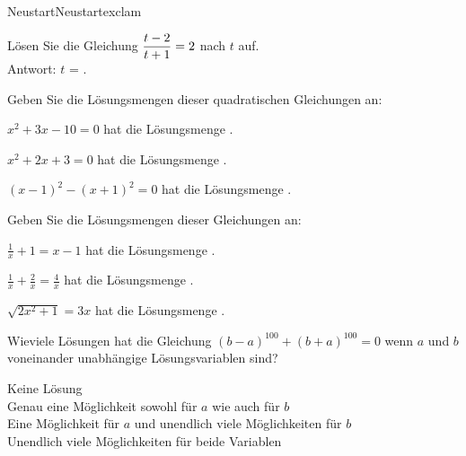 \begin{MXContent}{Neustart}{Neustart}{exclam}
\begin{MExercise}
Lösen Sie die Gleichung $\dfrac{t-2}{t+1}=2$ nach $t$ auf.\ \\
Antwort: $t$ = \: .
\end{MExercise}

\begin{MExercise}
Geben Sie die Lösungsmengen dieser quadratischen Gleichungen an:
\begin{MExerciseItems}
\item{$x^2+3x-10=0$ hat die Lösungsmenge .}
\item{$x^2+2x+3=0$ hat die Lösungsmenge .}
\item{$(x-1)^2-(x+1)^2=0$ hat die Lösungsmenge .}
\end{MExerciseItems}
\end{MExercise}


\begin{MExercise}
Geben Sie die Lösungsmengen dieser Gleichungen an:
\begin{MExerciseItems}
\item{$\frac1x+1=x-1$ hat die Lösungsmenge .}
\item{$\frac1x+\frac2x=\frac4x$ hat die Lösungsmenge .}
\item{$\sqrt{2x^2+1}=3x$ hat die Lösungsmenge .}
\end{MExerciseItems}

Wieviele Lösungen hat die Gleichung $(b-a)^{100}+(b+a)^{100}=0$ wenn $a$ und $b$ voneinander unabhängige Lösungsvariablen sind?\\
\begin{MQuestionGroup}
 Keine Lösung\ \\
 Genau eine Möglichkeit sowohl für $a$ wie auch für $b$\ \\
 Eine Möglichkeit für $a$ und unendlich viele Möglichkeiten für $b$\ \\
 Unendlich viele Möglichkeiten für beide Variablen
\end{MQuestionGroup}\ \\
\end{MExercise}



\end{MXContent}
